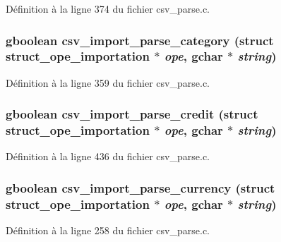 Définition à la ligne 374 du fichier csv\_\-parse.c.

\subsubsection[{csv\_\-import\_\-parse\_\-category}]{\setlength{\rightskip}{0pt plus 5cm}gboolean csv\_\-import\_\-parse\_\-category (struct {\bf struct\_\-ope\_\-importation} $\ast$ {\em ope}, \/  gchar $\ast$ {\em string})}\label{csv__parse_8h_a46cb8766a736010e02a6450c905d5447}


Définition à la ligne 359 du fichier csv\_\-parse.c.

\subsubsection[{csv\_\-import\_\-parse\_\-credit}]{\setlength{\rightskip}{0pt plus 5cm}gboolean csv\_\-import\_\-parse\_\-credit (struct {\bf struct\_\-ope\_\-importation} $\ast$ {\em ope}, \/  gchar $\ast$ {\em string})}\label{csv__parse_8h_a2ccbce0ca05fb2e453f3155cdeee95ac}


Définition à la ligne 436 du fichier csv\_\-parse.c.

\subsubsection[{csv\_\-import\_\-parse\_\-currency}]{\setlength{\rightskip}{0pt plus 5cm}gboolean csv\_\-import\_\-parse\_\-currency (struct {\bf struct\_\-ope\_\-importation} $\ast$ {\em ope}, \/  gchar $\ast$ {\em string})}\label{csv__parse_8h_acf8c665ebd5dcf808b746ed121036ceb}


Définition à la ligne 258 du fichier csv\_\-parse.c.

